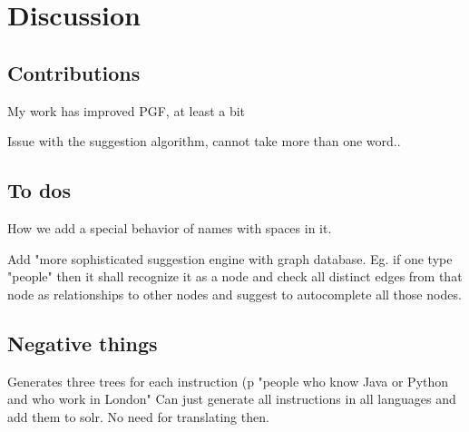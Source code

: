 \chapter{Discussion}\label{ch:discussion}

\section{Contributions}
My work has improved PGF, at least a bit


Issue with the suggestion algorithm, cannot take more than one word..

\section{To dos}
How we add a special behavior of names with spaces in it.

Add "more sophisticated suggestion engine with graph database. Eg. if one type "people" then it shall recognize it as a node and check all distinct edges from that node as relationships to other nodes and suggest to autocomplete all those nodes.
\section{Negative things}
Generates three trees for each instruction (p "people who know Java or Python and who work in London"
Can just generate all instructions in all languages and add them to solr. No need for translating then.